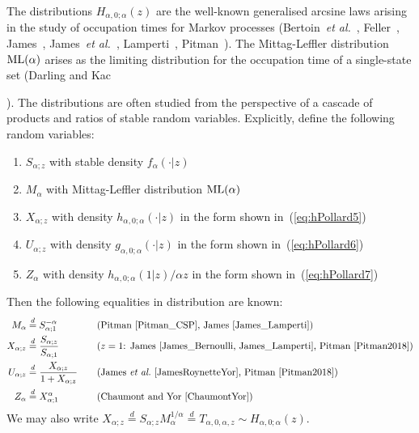 \documentclass[a4paper,12pt]{article}
\begin{document}
{{The distributions  $H_{\alpha,0; \alpha}(z)$  are  the well-known generalised arcsine laws %
 arising  in the study of  occupation times for  Markov processes
(Bertoin~{\it et al.}~\cite{Bertoin}, Feller~\cite[XIV.3]{Feller2}, James~\cite{James_Bernoulli, James_Lamperti}, 
James~{\it et al.}~\cite{JamesRoynetteYor},
Lamperti~\cite{Lamperti},  Pitman~\cite{Pitman_CSP, Pitman2018}).
The   Mittag-Leffler distribution  ${\rm ML}(\alpha)$   arises as 
the limiting distribution  for the occupation time of a single-state set (Darling and Kac~{\cite{DarlingKac}). 
The distributions are often studied from the perspective of a cascade of products and ratios of stable random variables.
Explicitly, define the   following random variables:  
\begin{enumerate}
\setlength{\itemsep}{0pt}
\item $S_{\alpha;z}$ with stable  density $f_\alpha(\cdot \vert z)$ 
\item $M_\alpha$ with  Mittag-Leffler distribution ${\rm ML}(\alpha)$ 
\item $X_{\alpha;z}$ with  density $h_{\alpha,0; \alpha}(\cdot\vert z)$  in the form shown in~(\ref{eq:hPollard5}) 
\item $U_{\alpha;z}$ with  density $g_{\alpha,0; \alpha}(\cdot \vert z)$  in the form shown in~(\ref{eq:hPollard6}) 
\item $Z_\alpha$ with  density $h_{\alpha,0; \alpha}(1 \vert z)/\alpha z$ in the form shown in~(\ref{eq:hPollard7})
\end{enumerate}
Then the following equalities in distribution are  known:
\begin{alignat*}{2}
M_\alpha &\overset{d}{=} S_{\alpha;1}^{-\alpha}   & & (\textrm{Pitman~\cite{Pitman_CSP},  James~\cite{James_Lamperti}})  \\ 
X_{\alpha;z} &\overset{d}{=}  \frac{S_{\alpha;z}}{S_{\alpha;1}} & &  (\textrm{$z=1$: James~\cite{James_Bernoulli, James_Lamperti}, Pitman~\cite{Pitman2018}}) \\ 
U_{\alpha;z} &\overset{d}{=}  \frac{X_{\alpha;z}}{1+X_{\alpha;z}} \quad & & 
(\textrm{James~{\it et al.}~\cite{JamesRoynetteYor}, Pitman~\cite{Pitman2018}}) \\
Z_\alpha &\overset{d}{=}  X_{\alpha;1}^\alpha  & & (\textrm{Chaumont and Yor~\cite[4.21.3(p116)]{ChaumontYor}})
\end{alignat*}
We may also write 
$X_{\alpha;z} \overset{d}{=}    S_{\alpha;z}M_\alpha^{1/\alpha} \overset{d}{=} T_{\alpha,0,\alpha,z}  \sim H_{\alpha,0; \alpha}(z)$.

}}}
\end{document}
